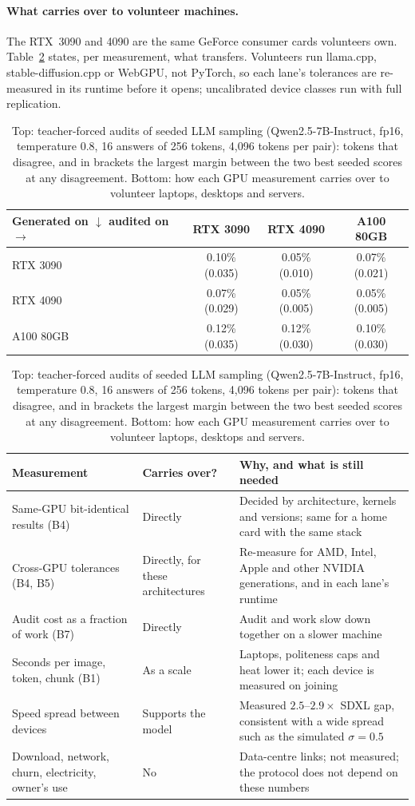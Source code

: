 \documentclass[11pt,a4paper]{article}
\theoremstyle{definition}
\theoremstyle{plain}
\begin{document}
\paragraph{What carries over to volunteer machines.} The RTX~3090 and 4090 are the same GeForce consumer cards
volunteers own. Table~\ref{tab:bench-llm} states, per measurement, what transfers. Volunteers run llama.cpp, stable-diffusion.cpp or WebGPU, not PyTorch, so each lane's tolerances are
re-measured in its runtime before it opens; uncalibrated device classes run with full replication.

\begin{table}[ht]
\centering
\caption{Top: teacher-forced audits of seeded LLM sampling (Qwen2.5-7B-Instruct, fp16, temperature 0.8, 16 answers
of 256 tokens, 4{,}096 tokens per pair): tokens that disagree, and in brackets the largest margin between the two
best seeded scores at any disagreement. Bottom: how each GPU measurement carries over to volunteer laptops, desktops
and servers.}\label{tab:bench-llm}
\small
\begin{tabular}{@{}lccc@{}}
\toprule
\textbf{Generated on} $\downarrow$ \quad audited on $\rightarrow$ & \textbf{RTX 3090} & \textbf{RTX 4090} & \textbf{A100 80GB} \\
\midrule
RTX 3090  & 0.10\% (0.035) & 0.05\% (0.010) & 0.07\% (0.021) \\
RTX 4090  & 0.07\% (0.029) & 0.05\% (0.005) & 0.05\% (0.005) \\
A100 80GB & 0.12\% (0.035) & 0.12\% (0.030) & 0.10\% (0.030) \\
\bottomrule
\end{tabular}

\vspace{6pt}
\begin{tabularx}{\linewidth}{@{}>{\raggedright\arraybackslash}p{3.6cm}>{\raggedright\arraybackslash}p{2.6cm}>{\raggedright\arraybackslash}X@{}}
\toprule
\textbf{Measurement} & \textbf{Carries over?} & \textbf{Why, and what is still needed} \\
\midrule
Same-GPU bit-identical results (B4) & Directly & Decided by architecture, kernels and versions; same for a home card with the same stack \\
Cross-GPU tolerances (B4, B5) & Directly, for these architectures & Re-measure for AMD, Intel, Apple and other NVIDIA generations, and in each lane's runtime \\
Audit cost as a fraction of work (B7) & Directly & Audit and work slow down together on a slower machine \\
Seconds per image, token, chunk (B1) & As a scale & Laptops, politeness caps and heat lower it; each device is measured on joining \\
Speed spread between devices & Supports the model & Measured $2.5$--$2.9\times$ SDXL gap, consistent with a wide spread such as the simulated $\sigma=0.5$ \\
Download, network, churn, electricity, owner's use & No & Data-centre links; not measured; the protocol does not depend on these numbers \\
\bottomrule
\end{tabularx}
\end{table}
\end{document}
